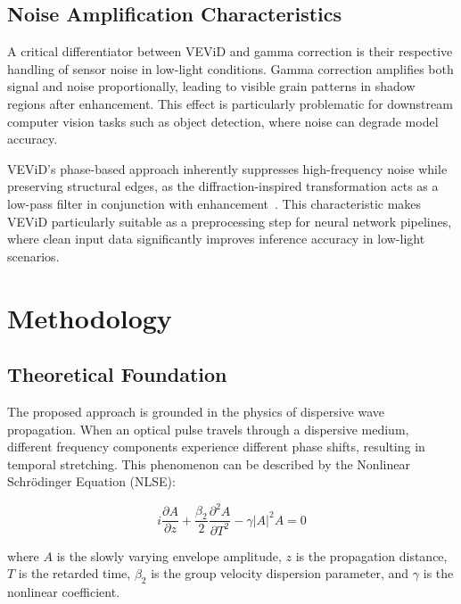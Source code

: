 \documentclass[journal,transmag]{IEEEtran}
\begin{document}
\subsection{Noise Amplification Characteristics}

A critical differentiator between VEViD and gamma correction is their respective handling of sensor noise in low-light conditions. Gamma correction amplifies both signal and noise proportionally, leading to visible grain patterns in shadow regions after enhancement. This effect is particularly problematic for downstream computer vision tasks such as object detection, where noise can degrade model accuracy.

VEViD's phase-based approach inherently suppresses high-frequency noise while preserving structural edges, as the diffraction-inspired transformation acts as a low-pass filter in conjunction with enhancement~\cite{asghari2015edge}. This characteristic makes VEViD particularly suitable as a preprocessing step for neural network pipelines, where clean input data significantly improves inference accuracy in low-light scenarios.


\section{Methodology}

\subsection{Theoretical Foundation}

The proposed approach is grounded in the physics of dispersive wave propagation. When an optical pulse travels through a dispersive medium, different frequency components experience different phase shifts, resulting in temporal stretching. This phenomenon can be described by the Nonlinear Schrödinger Equation (NLSE):

\begin{equation}
    \label{eq:nlse}
    i\frac{\partial A}{\partial z} + \frac{\beta_2}{2}\frac{\partial^2 A}{\partial T^2} - \gamma|A|^2 A = 0
\end{equation}

where $A$ is the slowly varying envelope amplitude, $z$ is the propagation distance, $T$ is the retarded time, $\beta_2$ is the group velocity dispersion parameter, and $\gamma$ is the nonlinear coefficient.
\end{document}
